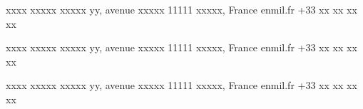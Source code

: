 
	{xxxx}
 	{xxxxx}
	{xxxxx}
	{yy, avenue xxxxx}
	{11111 xxxxx, France}
    {enmil.fr}
    {+33 xx xx xx xx}

	{xxxx}
 	{xxxxx}
	{xxxxx}
	{yy, avenue xxxxx}
	{11111 xxxxx, France}
    {enmil.fr}
    {+33 xx xx xx xx}
    
	{xxxx}
 	{xxxxx}
	{xxxxx}
	{yy, avenue xxxxx}
	{11111 xxxxx, France}
    {enmil.fr}
    {+33 xx xx xx xx}